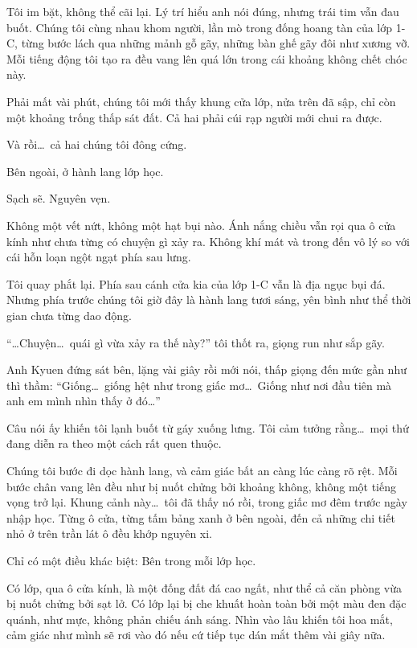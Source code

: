 \documentclass[../main.tex]{subfiles}
\begin{document}
Tôi im bặt, không thể cãi lại. Lý trí hiểu anh nói đúng, nhưng trái tim vẫn đau buốt. Chúng tôi cùng nhau khom người, lần mò trong đống hoang tàn của lớp 1-C, từng bước lách qua những mảnh gỗ gãy, những bàn ghế gãy đôi như xương vỡ. Mỗi tiếng động tôi tạo ra đều vang lên quá lớn trong cái khoảng không chết chóc này.

Phải mất vài phút, chúng tôi mới thấy khung cửa lớp, nửa trên đã sập, chỉ còn một khoảng trống thấp sát đất. Cả hai phải cúi rạp người mới chui ra được.

Và rồi\dots\ cả hai chúng tôi đông cứng.

Bên ngoài, ở hành lang lớp học.

Sạch sẽ. Nguyên vẹn.

Không một vết nứt, không một hạt bụi nào. Ánh nắng chiều vẫn rọi qua ô cửa kính như chưa từng có chuyện gì xảy ra. Không khí mát và trong đến vô lý so với cái hỗn loạn ngột ngạt phía sau lưng.


Tôi quay phắt lại. Phía sau cánh cửa kia của lớp 1-C vẫn là địa ngục bụi đá. Nhưng phía trước chúng tôi giờ đây là hành lang tươi sáng, yên bình như thể thời gian chưa từng dao động.

``\dots Chuyện\dots\ quái gì vừa xảy ra thế này?'' tôi thốt ra, giọng run như sắp gãy.

Anh Kyuen đứng sát bên, lặng vài giây rồi mới nói, thấp giọng đến mức gần như thì thầm: ``Giống\dots\ giống hệt như trong giấc mơ\dots\ Giống như nơi đầu tiên mà anh em mình nhìn thấy ở đó\dots''

Câu nói ấy khiến tôi lạnh buốt từ gáy xuống lưng. Tôi cảm tưởng rằng\dots\ mọi thứ đang diễn ra theo một cách rất quen thuộc.

Chúng tôi bước đi dọc hành lang, và cảm giác bất an càng lúc càng rõ rệt. Mỗi bước chân vang lên đều như bị nuốt chửng bởi khoảng không, không một tiếng vọng trở lại. Khung cảnh này\dots\ tôi đã thấy nó rồi, trong giấc mơ đêm trước ngày nhập học. Từng ô cửa, từng tấm bảng xanh ở bên ngoài, đến cả những chi tiết nhỏ ở trên trần lát ô đều khớp nguyên xi.

Chỉ có một điều khác biệt: Bên trong mỗi lớp học.

Có lớp, qua ô cửa kính, là một đống đất đá cao ngất, như thể cả căn phòng vừa bị nuốt chửng bởi sạt lở. Có lớp lại bị che khuất hoàn toàn bởi một màu đen đặc quánh, như mực, không phản chiếu ánh sáng. Nhìn vào lâu khiến tôi hoa mắt, cảm giác như mình sẽ rơi vào đó nếu cứ tiếp tục dán mắt thêm vài giây nữa.
\end{document}
